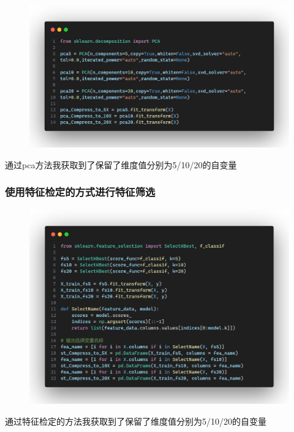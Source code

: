 \documentclass{article}
\begin{document}
\begin{figure}[H]
	\centering
	\includegraphics[width=\textwidth]{./img/pca_comp.png}
\end{figure}
通过pca方法我获取到了保留了维度值分别为5/10/20的自变量

\subsubsection{使用特征检定的方式进行特征筛选}

\begin{figure}[H]
	\centering
	\includegraphics[width=\textwidth]{./img/fs_comp.png}
\end{figure}
通过特征检定的方法我获取到了保留了维度值分别为5/10/20的自变量
\end{document}

